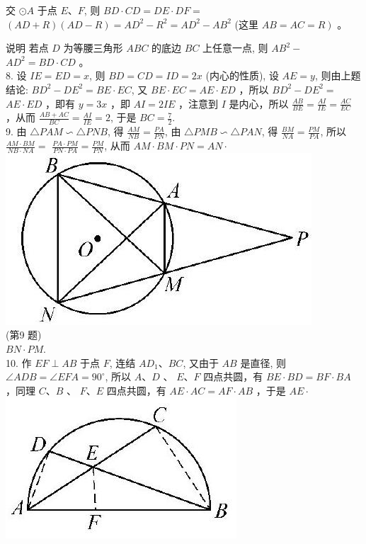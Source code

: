 \documentclass[10pt]{article}
\begin{document}
交 $\odot A$ 于点 $E 、 F$, 则 $B D \cdot C D=D E \cdot D F=$ $(A D+R)(A D-R)=A D^{2}-R^{2}=A D^{2}-A B^{2}$ (这里 $\left.A B=A C=R\right)$ 。

说明 若点 $D$ 为等腰三角形 $A B C$ 的底边 $B C$ 上任意一点, 则 $A B^{2}-$ $A D^{2}=B D \cdot C D$ 。\\
8. 设 $I E=E D=x$, 则 $B D=C D=I D=2 x$ (内心的性质), 设 $A E=y$, 则由上题结论: $B D^{2}-D E^{2}=B E \cdot E C$, 又 $B E \cdot E C=A E \cdot E D$ ，所以 $B D^{2}-D E^{2}=$ $A E \cdot E D$ ，即有 $y=3 x$ ，即 $A I=2 I E$ ，注意到 $I$ 是内心，所以 $\frac{A B}{B E}=\frac{A I}{I E}=\frac{A C}{E C}$ ，从而 $\frac{A B+A C}{B C}=\frac{A I}{I E}=2$, 于是 $B C=\frac{7}{2}$.\\
9. 由 $\triangle P A M \backsim \triangle P N B$, 得 $\frac{A M}{N B}=\frac{P A}{P N}$, 由 $\triangle P M B \backsim \triangle P A N$, 得 $\frac{B M}{N A}=\frac{P M}{P A}$, 所以 $\frac{A M \cdot B M}{N B \cdot N A}=$ $\frac{P A \cdot P M}{P N \cdot P A}=\frac{P M}{P N}$, 从而 $A M \cdot B M \cdot P N=A N \cdot$\\
\includegraphics[max width=\textwidth, center]{2024_10_30_66b8e5e701da2093c133g-099(2)}\\
(第9 题)\\
$B N \cdot P M$.\\
10. 作 $E F \perp A B$ 于点 $F$, 连结 $A D_{1} 、 B C$, 又由于 $A B$ 是直径, 则 $\angle A D B=\angle E F A=90^{\circ}$, 所以 $A 、 D$ 、 $E 、 F$ 四点共圆，有 $B E \cdot B D=B F \cdot B A$ ，同理 $C 、 B$ 、 $F 、 E$ 四点共圆，有 $A E \cdot A C=A F \cdot A B$ ，于是 $A E \cdot$\\
\includegraphics[max width=\textwidth, center]{2024_10_30_66b8e5e701da2093c133g-099(3)}\\
\end{document}
